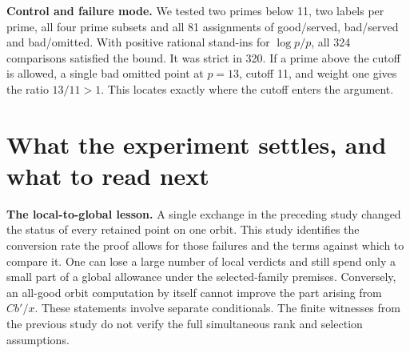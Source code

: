 \documentclass[12pt,letterpaper]{article}
\newcommand{\para}[1]{\par\medskip\noindent\textbf{#1}\quad}
\newcommand{\pagepart}[1]{\clearpage\section{#1}}
\begin{document}
\para{Control and failure mode.} We tested two primes below 11, two labels per prime, all four prime subsets and all 81 assignments of good/served, bad/served and bad/omitted. With positive rational stand-ins for \(\log p/p\), all 324 comparisons satisfied the bound. It was strict in 320. If a prime above the cutoff is allowed, a single bad omitted point at \(p=13\), cutoff 11, and weight one gives the ratio \(13/11>1\). This locates exactly where the cutoff enters the argument.

\pagepart{What the experiment settles, and what to read next}
\para{The local-to-global lesson.} A single exchange in the preceding study changed the status of every retained point on one orbit. This study identifies the conversion rate the proof allows for those failures and the terms against which to compare it. One can lose a large number of local verdicts and still spend only a small part of a global allowance under the selected-family premises. Conversely, an all-good orbit computation by itself cannot improve the part arising from \(Cb'/x\). These statements involve separate conditionals. The finite witnesses from the previous study do not verify the full simultaneous rank and selection assumptions.
\end{document}
